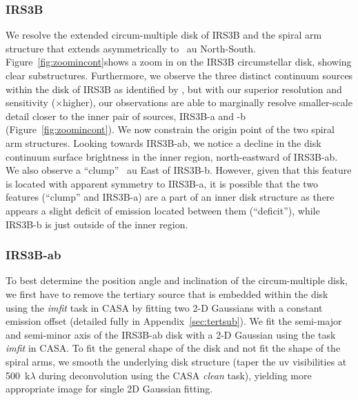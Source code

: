 \documentclass[twocolumn, 12pt, trackchanges]{aastex63}
\begin{document}
\subsubsection{IRS3B}
We resolve the extended circum-multiple disk of IRS3B and the spiral arm structure that extends asymmetrically to ~au North-South. Figure~\ref{fig:zoomincont}\space shows a zoom in on the IRS3B circumstellar disk, showing clear substructures. Furthermore, we observe the three distinct continuum sources within the disk of IRS3B as identified by \citet{2016Natur.538..483T}, but with our superior resolution and sensitivity ($\times$\space higher), our observations are able to marginally resolve smaller-scale detail closer to the inner pair of sources, IRS3B-a and -b (Figure~\ref{fig:zoomincont}). We now constrain the origin point of the two spiral arm structures. Looking towards IRS3B-ab, we notice a decline in the disk continuum surface brightness in the inner region, north-eastward of IRS3B-ab. We also observe a ``clump'' ~au East of IRS3B-b. However, given that this feature is located with apparent symmetry to IRS3B-a, it is possible that the two features (``clump'' and IRS3B-a) are a part of an inner disk structure as there appears a slight deficit of emission located between them (``deficit''), while IRS3B-b is just outside of the inner region. 

\subsubsection{IRS3B-ab}
To best determine the position angle and inclination of the circum-multiple disk, we first have to remove the tertiary source that is embedded within the disk using the \textit{imfit} task in CASA by fitting two 2-D Gaussians with a constant emission offset (detailed fully in Appendix~\ref{sec:tertsub}). We fit the semi-major and semi-minor axis of the IRS3B-ab disk with a 2-D Gaussian using the task \textit{imfit} in CASA. To fit the general shape of the disk and not fit the shape of the spiral arms, we smooth the underlying disk structure (taper the uv visibilities at 500~k$\lambda$ during deconvolution using the CASA \textit{clean} task), yielding more appropriate image for single 2D Gaussian fitting. 
\end{document}
